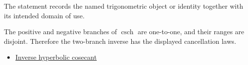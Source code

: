 \begin{remark*}[Interpretation]
The statement records the named trigonometric object or identity together with
its intended domain of use.
\end{remark*}

\begin{remark*}[Proof]
The positive and negative branches of $\operatorname{csch}$ are one-to-one,
and their ranges are disjoint. Therefore the two-branch inverse has the
displayed cancellation laws.
\end{remark*}
\begin{dependencies}
\begin{itemize}
  \item \hyperref[def:inverse-hyperbolic-cosecant]{Inverse hyperbolic cosecant}
\end{itemize}
\end{dependencies}
